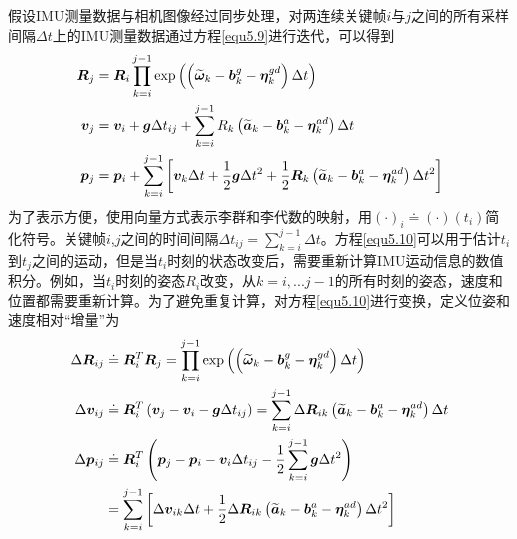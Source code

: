 假设IMU测量数据与相机图像经过同步处理，对两连续关键帧$i$与$j$之间的所有采样间隔$\Delta t$上的IMU测量数据通过方程\eqref{equ5.9}进行迭代，可以得到
\begin{equation}
\label{equ5.10}
\begin{aligned}
\boldsymbol{R}_j &= \boldsymbol{R}_i \prod\limits_{k=i}^{j-1}\exp \left( \left( \widetilde{\boldsymbol{\omega}}_k - \boldsymbol{b}_k^g-\boldsymbol{\eta}_k^{gd} \right) \Delta t  \right) 
\\ 
\boldsymbol{v}_j &= \boldsymbol{v}_i+\boldsymbol{g} \Delta t_{ij} +  \sum\limits_{k=i}^{j-1}R_k \left( \widetilde{\boldsymbol{a}}_k - \boldsymbol{b}_k^a -\boldsymbol{\eta}_k^{ad} \right)\Delta t
\\
\boldsymbol{p}_j &= \boldsymbol{p}_i + \sum\limits_{k=i}^{j-1} \left[ \boldsymbol{v}_k \Delta t + {1 \over 2}\boldsymbol{g}\Delta t^2 + {1 \over 2}\boldsymbol{R}_k \left( \widetilde{\boldsymbol{a}}_k - \boldsymbol{b}_k^a -\boldsymbol{\eta}_k^{ad} \right)\Delta t^2 \right]
\end{aligned}
\end{equation}
为了表示方便，使用向量方式表示李群和李代数的映射，用$(\cdot)_i \doteq (\cdot)(t_i)$简化符号。关键帧$i$,$j$之间的时间间隔$\Delta t_{ij} = \sum_{k=i}^{j-1}\Delta t$。方程\eqref{equ5.10}可以用于估计$t_i$到$t_j$之间的运动，但是当$t_i$时刻的状态改变后，需要重新计算IMU运动信息的数值积分。例如，当$t_i$时刻的姿态$R_i$改变，从$k=i,...j-1$的所有时刻的姿态，速度和位置都需要重新计算。为了避免重复计算，对方程\eqref{equ5.10}进行变换，定义位姿和速度相对“增量”为
\begin{equation}
\label{equ5.11}
\begin{aligned}
\Delta \boldsymbol{R}_{ij} &\doteq \boldsymbol{R}_i^T \boldsymbol{R}_j = \prod\limits_{k=i}^{j-1}\exp \left( \left( \widetilde{\boldsymbol{\omega}}_k - \boldsymbol{b}_k^g-\boldsymbol{\eta}_k^{gd} \right) \Delta t   \right) 
\\ 
\Delta \boldsymbol{v}_{ij} &\doteq \boldsymbol{R}_i^T\left( \boldsymbol{v}_j-\boldsymbol{v}_i-\boldsymbol{g}\Delta t_{ij}\right) =  \sum\limits_{k=i}^{j-1} \Delta \boldsymbol{R}_{ik} \left( \widetilde{\boldsymbol{a}}_k - \boldsymbol{b}_k^a -\boldsymbol{\eta}_k^{ad} \right)\Delta t
\\ 
\Delta \boldsymbol{p}_{ij} &\doteq \boldsymbol{R}_i^T \left( \boldsymbol{p}_j-\boldsymbol{p}_i-\boldsymbol{v}_i\Delta  t_{ij} - {1 \over 2} \sum\limits_{k=i}^{j-1} \boldsymbol{g} \Delta t^2 \right) \\
&=  \sum\limits_{k=i}^{j-1} \left[ \Delta \boldsymbol{v}_{ik} \Delta t + {1 \over 2}\Delta \boldsymbol{R}_{ik} \left( \widetilde{\boldsymbol{a}}_k - \boldsymbol{b}_k^a -\boldsymbol{\eta}_k^{ad} \right)\Delta t^2 \right]
\end{aligned}
\end{equation}
